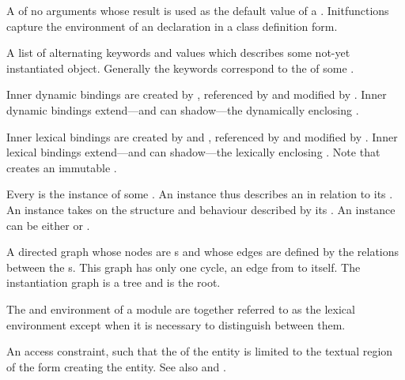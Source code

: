 \begin{optDefinition}
\begin{definitions}
      A  of
    no arguments whose result is used as the default value of a .
    Initfunctions capture the  environment of an 
    declaration in a class definition form.

      A list of alternating
    keywords and values which describes some not-yet instantiated object.
    Generally the keywords correspond to the  of some .

     Inner dynamic
    bindings are created by , referenced by
     and modified by .  Inner dynamic
    bindings extend---and can shadow---the dynamically enclosing .

     Inner lexical
    bindings are created by  and ,
    referenced by  and modified by .  Inner
    lexical bindings extend---and can shadow---the lexically enclosing
    .  Note that  creates an immutable
    .

      Every  is the
    instance of some .  An instance thus describes an 
    in relation to its .  An instance takes on the structure and
    behaviour described by its .  An instance can be either
     or .

      A
    directed graph whose nodes are s and whose edges are defined
    by the  relations between the s.  This graph has
    only one cycle, an edge from  to itself.  The instantiation
    graph is a tree and  is the root.

     The
     and  environment of a module are together
    referred to as the lexical environment except when it is necessary to
    distinguish between them.

     An access
    constraint, such that the  of the entity is limited to the
    textual region of the form creating the entity.  See also  and .


\end{definitions}
\end{optDefinition}
